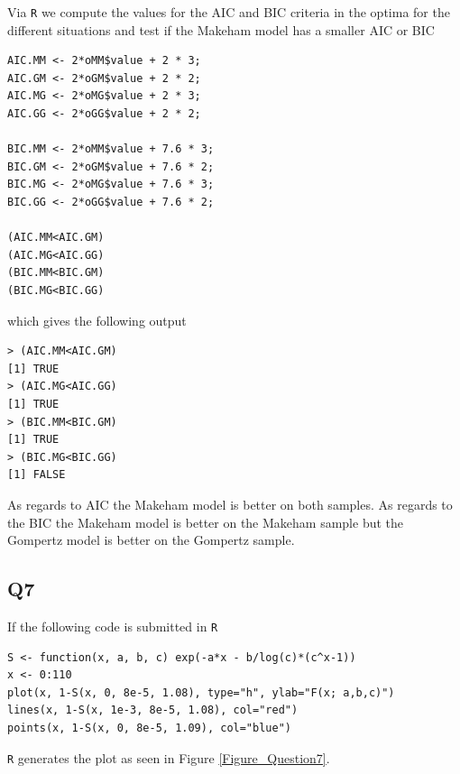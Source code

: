 Via \verb|R| we compute the values for the AIC and BIC criteria in the optima for the different situations and test if the Makeham model has a smaller AIC or BIC
\begin{verbatim}
AIC.MM <- 2*oMM$value + 2 * 3;
AIC.GM <- 2*oGM$value + 2 * 2;
AIC.MG <- 2*oMG$value + 2 * 3;
AIC.GG <- 2*oGG$value + 2 * 2;

BIC.MM <- 2*oMM$value + 7.6 * 3;
BIC.GM <- 2*oGM$value + 7.6 * 2;
BIC.MG <- 2*oMG$value + 7.6 * 3;
BIC.GG <- 2*oGG$value + 7.6 * 2;

(AIC.MM<AIC.GM)
(AIC.MG<AIC.GG)
(BIC.MM<BIC.GM)
(BIC.MG<BIC.GG)
\end{verbatim}
which gives the following output

\begin{verbatim}
> (AIC.MM<AIC.GM)
[1] TRUE
> (AIC.MG<AIC.GG)
[1] TRUE
> (BIC.MM<BIC.GM)
[1] TRUE
> (BIC.MG<BIC.GG)
[1] FALSE
\end{verbatim}

As regards to AIC the Makeham model is better on both samples. As regards to the BIC the Makeham model is better on the Makeham sample but the Gompertz model is better on the Gompertz sample.

\subsection*{Q7}

If the following code is submitted in \verb|R|

\begin{verbatim}
S <- function(x, a, b, c) exp(-a*x - b/log(c)*(c^x-1))
x <- 0:110
plot(x, 1-S(x, 0, 8e-5, 1.08), type="h", ylab="F(x; a,b,c)")
lines(x, 1-S(x, 1e-3, 8e-5, 1.08), col="red")
points(x, 1-S(x, 0, 8e-5, 1.09), col="blue")
\end{verbatim}
\verb|R| generates the plot as seen in Figure \ref{Figure_Question7}.

